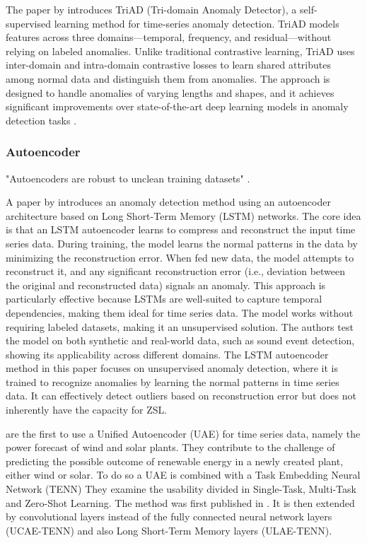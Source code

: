 The paper by  introduces TriAD (Tri-domain Anomaly Detector), a self-supervised learning method for time-series anomaly detection. TriAD models features across three domains—temporal, frequency, and residual—without relying on labeled anomalies. Unlike traditional contrastive learning, TriAD uses inter-domain and intra-domain contrastive losses to learn shared attributes among normal data and distinguish them from anomalies. The approach is designed to handle anomalies of varying lengths and shapes, and it achieves significant improvements over state-of-the-art deep learning models in anomaly detection tasks .



\subsubsection{Autoencoder}
"Autoencoders are robust to unclean training datasets" .

A paper by  introduces an anomaly detection method using an autoencoder architecture based on Long Short-Term Memory (LSTM) networks. The core idea is that an LSTM autoencoder learns to compress and reconstruct the input time series data. During training, the model learns the normal patterns in the data by minimizing the reconstruction error. When fed new data, the model attempts to reconstruct it, and any significant reconstruction error (i.e., deviation between the original and reconstructed data) signals an anomaly. This approach is particularly effective because LSTMs are well-suited to capture temporal dependencies, making them ideal for time series data. The model works without requiring labeled datasets, making it an unsupervised solution. The authors test the model on both synthetic and real-world data, such as sound event detection, showing its applicability across different domains. The LSTM autoencoder method in this paper focuses on unsupervised anomaly detection, where it is trained to recognize anomalies by learning the normal patterns in time series data. It can effectively detect outliers based on reconstruction error but does not inherently have the capacity for ZSL.

 are the first to use a Unified Autoencoder (UAE) for time series data, namely the power forecast of wind and solar plants. They contribute to the challenge of predicting the possible outcome of renewable energy in a newly created plant, either wind or solar. To do so a UAE is combined with a Task Embedding Neural Network (TENN) They examine the usability divided in Single-Task, Multi-Task and Zero-Shot Learning. The method was first published in . It is then extended by convolutional layers instead of the fully connected neural network layers (UCAE-TENN) and also Long Short-Term Memory layers (ULAE-TENN).

